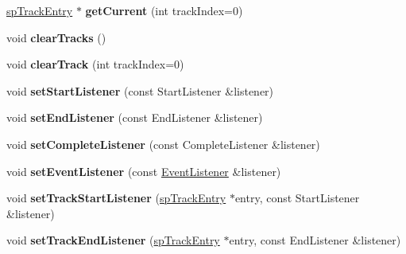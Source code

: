 \begin{DoxyCompactItemize}
\hyperlink{structspTrackEntry}{sp\+Track\+Entry} $\ast$ {\bfseries get\+Current} (int track\+Index=0)
\item 
\mbox{\label{classspine_1_1SkeletonAnimation_a3495825f32c03295d06f57d1d79b7da0}} 
void {\bfseries clear\+Tracks} ()
\item 
\mbox{\label{classspine_1_1SkeletonAnimation_a984604c1c3f05bef91e2d9694dd306c2}} 
void {\bfseries clear\+Track} (int track\+Index=0)
\item 
\mbox{\label{classspine_1_1SkeletonAnimation_a934470b683acd7cc79e9572d3df5638b}} 
void {\bfseries set\+Start\+Listener} (const Start\+Listener \&listener)
\item 
\mbox{\label{classspine_1_1SkeletonAnimation_a200f2b67b1531084eca11abe2afa8d5f}} 
void {\bfseries set\+End\+Listener} (const End\+Listener \&listener)
\item 
\mbox{\label{classspine_1_1SkeletonAnimation_a90da8648913d4abfa84f8b70ed5b7127}} 
void {\bfseries set\+Complete\+Listener} (const Complete\+Listener \&listener)
\item 
\mbox{\label{classspine_1_1SkeletonAnimation_add74538b2e902a827405724cefc2a5e1}} 
void {\bfseries set\+Event\+Listener} (const \hyperlink{classEventListener}{Event\+Listener} \&listener)
\item 
\mbox{\label{classspine_1_1SkeletonAnimation_a29901a201785b3f8ac7949756a6b1748}} 
void {\bfseries set\+Track\+Start\+Listener} (\hyperlink{structspTrackEntry}{sp\+Track\+Entry} $\ast$entry, const Start\+Listener \&listener)
\item 
\mbox{\label{classspine_1_1SkeletonAnimation_a64aca05c942018c39312b94d958b75de}} 
void {\bfseries set\+Track\+End\+Listener} (\hyperlink{structspTrackEntry}{sp\+Track\+Entry} $\ast$entry, const End\+Listener \&listener)
\item 
\mbox{\label{classspine_1_1SkeletonAnimation_a5e5eb7b82faf2c6e834555dc19a35b6d}} 

\end{DoxyCompactItemize}
